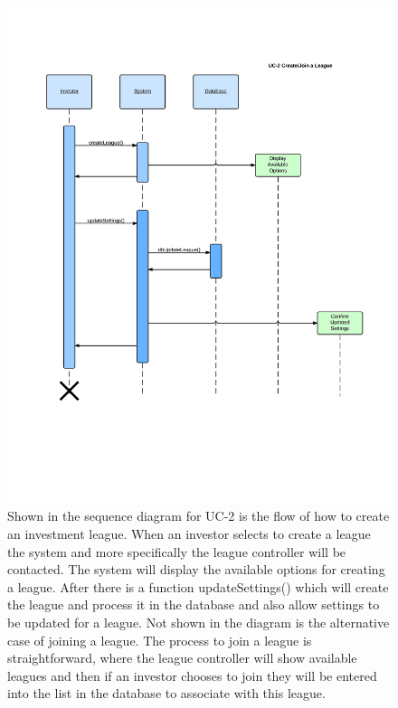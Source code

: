 \begin{figure}[H]
\centering
\includegraphics[width=5.5in]{./img/inter/uc2.jpg}
\caption
{Shown in the sequence diagram for
UC-2 is the flow of how to create an investment league. When an
investor selects to create a league the system and more specifically
the league controller will be contacted. The system will display
the available options for creating a league. After there is a function
updateSettings() which will create the league and process it in the
database and also allow settings to be updated for a league. Not
shown in the diagram is the alternative case of joining a league.
The process to join a league is straightforward, where the league
controller will show available leagues and then if an investor
chooses to join they will be entered into the list in the database
to associate with this league.}
\end{figure}



